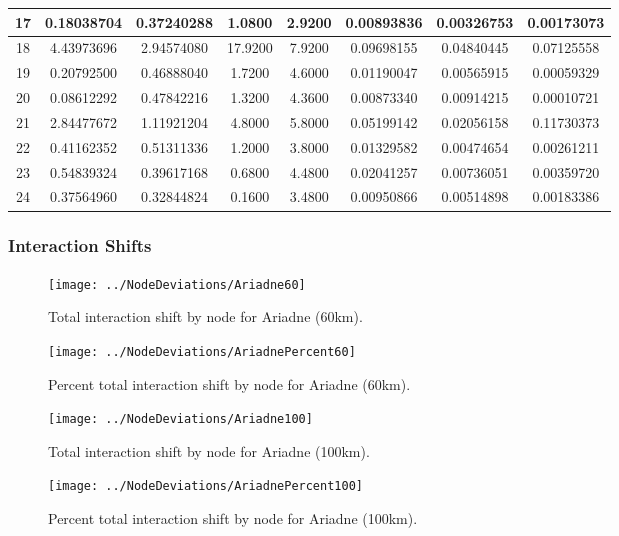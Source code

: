 \documentclass[12pt,a4paper]{thesis}
\begin{document}
\begin{table}[H]
\begin{tabular}{|c|c|c|c|c|c|c|c|}
\hline	17	&	0.18038704	&	0.37240288	&	1.0800	&	2.9200	&	0.00893836	&	0.00326753	&	0.00173073	\\
\hline	18	&	4.43973696	&	2.94574080	&	17.9200	&	7.9200	&	0.09698155	&	0.04840445	&	0.07125558	\\
\hline	19	&	0.20792500	&	0.46888040	&	1.7200	&	4.6000	&	0.01190047	&	0.00565915	&	0.00059329	\\
\hline	20	&	0.08612292	&	0.47842216	&	1.3200	&	4.3600	&	0.00873340	&	0.00914215	&	0.00010721	\\
\hline	21	&	2.84477672	&	1.11921204	&	4.8000	&	5.8000	&	0.05199142	&	0.02056158	&	0.11730373	\\
\hline	22	&	0.41162352	&	0.51311336	&	1.2000	&	3.8000	&	0.01329582	&	0.00474654	&	0.00261211	\\
\hline	23	&	0.54839324	&	0.39617168	&	0.6800	&	4.4800	&	0.02041257	&	0.00736051	&	0.00359720	\\
\hline	24	&	0.37564960	&	0.32844824	&	0.1600	&	3.4800	&	0.00950866	&	0.00514898	&	0.00183386	\\
\hline 
\end{tabular} 
\label{tab:ariadneNodeAfter100}
\end{table}

\subsubsection{Interaction Shifts}

\begin{figure}[H]
\centering
\texttt{[image: ../NodeDeviations/Ariadne60]}
\caption{Total interaction shift by node for Ariadne (60km).}
\label{fig:Ariadne60}
\end{figure}

\begin{figure}[H]
\centering
\texttt{[image: ../NodeDeviations/AriadnePercent60]}
\caption{Percent total interaction shift by node for Ariadne (60km).}
\label{fig:AriadnePercent60}
\end{figure}

\begin{figure}[H]
\centering
\texttt{[image: ../NodeDeviations/Ariadne100]}
\caption{Total interaction shift by node for Ariadne (100km).}
\label{fig:Ariadne100}
\end{figure}

\begin{figure}[H]
\centering
\texttt{[image: ../NodeDeviations/AriadnePercent100]}
\caption{Percent total interaction shift by node for Ariadne (100km).}
\label{fig:AriadnePercent100}
\end{figure}
\end{document}

